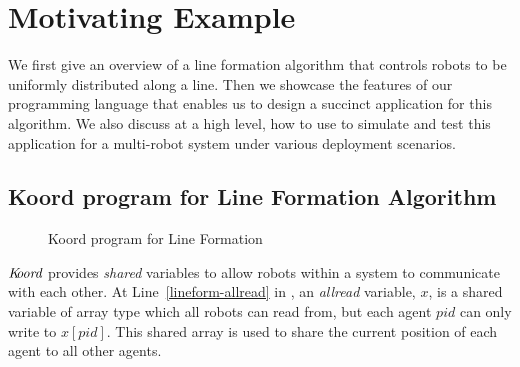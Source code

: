 \section{Motivating Example}
\label{sec:overview}



We first give an overview of a line formation algorithm that controls robots to be uniformly distributed along a line.
Then we showcase the features of our programming language \lgname that enables us to design a succinct application for this algorithm.
We also discuss at a high level, how to use \toolname to simulate and test this application for a multi-robot system under various deployment scenarios.


\subsection{Koord program for Line Formation Algorithm}

\begin{figure}[h!]
    {
        
    }
    {
        
    }
    \caption{Koord program for Line Formation}\label{fig:lineform}
\end{figure}


$\emph{K\kern-2pt oord}$ provides \emph{shared} variables to allow robots within a system to communicate with each other.
At Line~\ref{lineform-allread} in , an \emph{allread} variable, $x$, is a shared variable of array type which all robots can read from,
but each agent $pid$ can only write to $x[pid]$.
This shared array is used to share the current position of each agent to all other agents.




